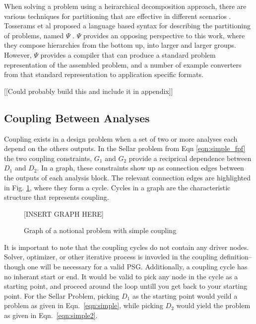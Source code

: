   When solving a problem using a heirarchical decomposition approach, 
  there are various techniques for partitioning that are effective in different 
  scenarios \cite{krishnamachari1997optimal,michelena1997hypergraph,
  sobieszczanski1997,Perez2004,allison2009optimal}. Tosserams et al proposed a 
  language based syntax for describing the partitioning of problems, named $\Psi$
  \cite{tosserams2010specification}. $\Psi$ provides an opposing perspective to 
  this work, where they compose hierarchies from the bottom up, into larger and 
  larger groups. However, $\Psi$ provides a compiler that can produce a standard 
  problem representation of the assembled problem, and a number of example converters
  from that standard representation to application specific formats. 

  [[Could probably build this and include it in appendix]] 


\subsection{Coupling Between Analyses}

  Coupling exists in a design problem when a set of two or more analyses each depend on the
  others outputs. In the Sellar problem from Eqn \ref{eqn:simple_fpf} the two 
  coupling constraints, $G_1$ and $G_2$ provide a reciprical dependence between 
  $D_1$ and $D_2$. In a graph, these constraints show up as connection edges between 
  the outputs of each analysis block. The relevant connection edges are highlighted in 
  Fig. \ref{f:coupling}, where they form a cycle. Cycles in a graph are the characteristic 
  structure that represents coupling. 

  \begin{figure}
      \begin{center}
      [INSERT GRAPH HERE]
      \caption{Graph of a notional problem with simple coupling \label{f:coupling}}
      \end{center}
  \end{figure}

	It is important to note that the coupling cycles do not contain 
	any driver nodes. Solver, optimizer, or other iterative process is 
	invovled in the coupling definition--though one will be necessary for a valid 
  PSG. Additionally, a coupling cycle has no inherant start or end. It would be
  valid to pick any node in the cycle as a starting point, and proceed around the
  loop untill you get back to your starting point. For the Sellar Problem, picking 
  $D_1$ as the starting point would yeild a problem as given in 
	Eqn.~\ref{eqn:simple}, while picking $D_2$ would yield the problem as given in 
  Eqn.~\ref{eqn:simple2}.

